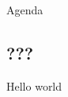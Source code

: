 
\begin{frame}[t,plain]
\titlepage
\end{frame}

\begin{frame}{Agenda}
\tableofcontents
\end{frame}




\begin{frame}{\section{???}}
\begin{center}
  Hello world
\end{center}
\end{frame}
